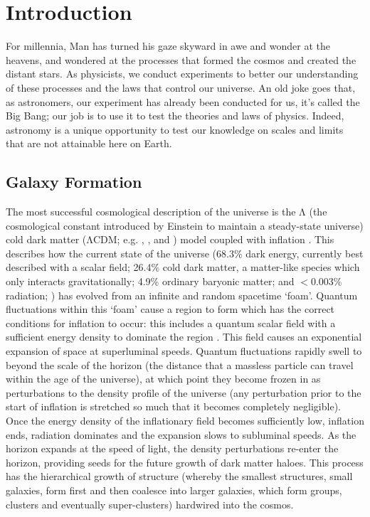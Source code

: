 \chapter{Introduction}
	\label{cha:intro}
For millennia, Man has turned his gaze skyward in awe and wonder at the heavens, and wondered at the processes that formed the cosmos and created the distant stars. As physicists, we conduct experiments to better our understanding of these processes and the laws that control our universe. An old joke goes that, as astronomers, our experiment has already been conducted for us, it's called the Big Bang; our job is to use it to test the theories and laws of physics. Indeed, astronomy is a unique opportunity to test our knowledge on scales and limits that are not attainable here on Earth.

\section{Galaxy Formation}
	The most successful cosmological description of the universe is the $\mathrm{\Lambda}$ (the cosmological constant introduced by Einstein to maintain a steady-state universe) cold dark matter ({$\mathrm{\Lambda}$}CDM; e.g. \citealt{Peebles1982}, \citealt{Bond1982}, \citealt{Blumenthal1982} and \citealt{Blumenthal1984}) model coupled with inflation \citep[e.g.][]{Guth1981}. This describes how the current state of the universe (68.3\% dark energy, currently best described with a scalar field; 26.4\% cold dark matter, a matter-like species which only interacts gravitationally; 4.9\% ordinary baryonic matter; and $<$0.003\% radiation; \citealt{PlanckCollaboration2016}) has evolved from an infinite and random spacetime `foam'. Quantum fluctuations within this `foam' cause a region to form which has the correct conditions for inflation to occur: this includes a quantum scalar field with a sufficient energy density to dominate the region \citep{Linde1982, Albrecht1982}. This field causes an exponential expansion of space at superluminal speeds. Quantum fluctuations rapidly swell to beyond the scale of the horizon (the distance that a massless particle can travel within the age of the universe), at which point they become frozen in as perturbations to the density profile of the universe (any perturbation prior to the start of inflation is stretched so much that it becomes completely negligible). Once the energy density of the inflationary field becomes sufficiently low, inflation ends, radiation dominates and the expansion slows to subluminal speeds. As the horizon expands at the speed of light, the density perturbations re-enter the horizon, providing seeds for the future growth of dark matter haloes. This process has the hierarchical growth of structure (whereby the smallest structures, small galaxies, form first and then coalesce into larger galaxies, which form groups, clusters and eventually super-clusters) hardwired into the cosmos. 

